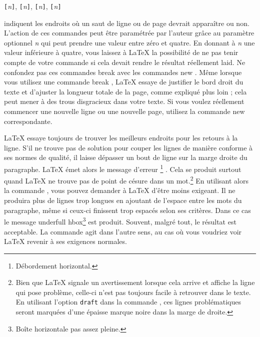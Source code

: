 \begin{lscommand}
\verb|[|\emph{n}\verb|]|,
\verb|[|\emph{n}\verb|]|,
\verb|[|\emph{n}\verb|]|,
\verb|[|\emph{n}\verb|]|
\end{lscommand}
\noindent indiquent les endroits où un saut de ligne ou de page devrait
apparaître ou non. L'action de ces commandes peut être paramétrée par l'auteur
grâce au paramètre optionnel \emph{n}
qui peut prendre une valeur entre zéro et quatre. En donnant à \emph{n}
une valeur inférieure à quatre, vous laissez à \LaTeX{} la possibilité
de ne pas tenir compte de votre commande si cela devait rendre le
résultat réellement laid.  Ne confondez pas ces commandes \og break
\fg{} avec les commandes \og new \fg{}.  Même lorsque vous utilisez
une commande \og break \fg{}, \LaTeX{} essaye de justifier le bord
droit du texte et d'ajuster la longueur totale de la page, comme
expliqué plus loin ; cela peut mener à des trous disgracieux dans
votre texte.  Si vous voulez réellement commencer une \og nouvelle
\fg{} ligne ou une \og nouvelle \fg{} page, utilisez la commande \og
new \fg{} correspondante.

\LaTeX{} essaye toujours de trouver les meilleurs endroits pour les
retours à la ligne.
S'il ne trouve pas de solution pour couper les lignes de
manière conforme à ses normes de qualité, il laisse dépasser un bout
de ligne sur la marge droite du paragraphe. \LaTeX{} émet alors le
message d'erreur \og {}
\footnote{Débordement
horizontal.} \fg{}. Cela se produit surtout quand \LaTeX{} ne trouve pas
de point de césure dans un mot.\footnote{Bien que \LaTeX{} signale un
  avertissement lorsque cela arrive et affiche la
  ligne qui pose problème, celle-ci n'est pas toujours facile à
  retrouver dans le texte. En utilisant l'option \texttt{draft} dans
  la commande , ces lignes problématiques seront
  marquées d'une épaisse marque noire dans la marge de droite.}
En utilisant alors la commande ,
vous pouvez demander à \LaTeX{} d'être moins exigeant. Il ne produira
 plus de lignes trop longues en ajoutant de l'espace entre les
mots du paragraphe, même si ceux-ci finissent trop espacés selon ses
critères. Dans ce cas le message \og {}
{underfull hbox}\footnote{Boîte
horizontale pas assez pleine.} \fg{} est produit. Souvent, malgré tout, le
résultat est acceptable. La commande  agit dans l'autre
sens, au cas où vous voudriez voir \LaTeX{} revenir à ses exigences
normales.

